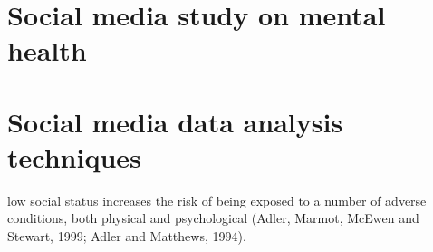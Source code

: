 \section{Social media study on mental health}



\section{Social media data analysis techniques}

low social status increases the risk of being exposed to a number of adverse conditions, both physical and psychological (Adler, Marmot, McEwen and Stewart, 1999; Adler and Matthews, 1994). 











